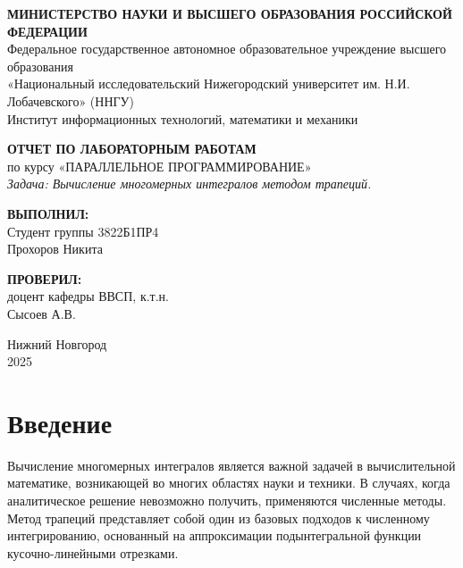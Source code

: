 \documentclass[14pt,a4paper]{extarticle}
\begin{document}
\begin{titlepage}
\begin{center}

\onehalfspacing

\begin{center}
    \textbf{МИНИСТЕРСТВО НАУКИ И ВЫСШЕГО ОБРАЗОВАНИЯ РОССИЙСКОЙ ФЕДЕРАЦИИ} \\
    Федеральное государственное автономное образовательное учреждение высшего образования \\
    «Национальный исследовательский Нижегородский университет им. Н.И. Лобачевского» (ННГУ) \\
    Институт информационных технологий, математики и механики
\end{center}

\vspace{4cm}

\begin{center}
    \textbf{ОТЧЕТ ПО ЛАБОРАТОРНЫМ РАБОТАМ} \vspace{0.5cm}\\
    по курсу «ПАРАЛЛЕЛЬНОЕ ПРОГРАММИРОВАНИЕ» \vspace{0.5cm}\\
    \textit{Задача: Вычисление многомерных интегралов методом трапеций.}
\end{center}

\vspace{4cm}

\begin{flushright}
    \textbf{ВЫПОЛНИЛ:} \\ 
    Студент группы 3822Б1ПР4 \\ 
    Прохоров Никита \\

    \vspace{1cm}

    \textbf{ПРОВЕРИЛ:} \\ 
    доцент кафедры ВВСП, к.т.н. \\ 
    Сысоев А.В.
\end{flushright}

\begin{center}
    Нижний Новгород\\
    2025
\end{center}

\end{center}
\end{titlepage}

\tableofcontents
\newpage

\section{Введение}
Вычисление многомерных интегралов является важной задачей в вычислительной математике, возникающей во многих областях науки и техники. В случаях, когда аналитическое решение невозможно получить, применяются численные методы. Метод трапеций представляет собой один из базовых подходов к численному интегрированию, основанный на аппроксимации подынтегральной функции кусочно-линейными отрезками.
\end{document}
